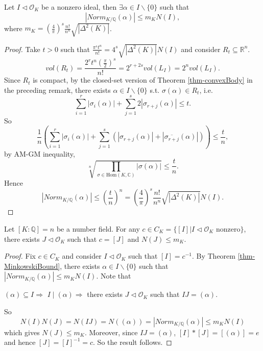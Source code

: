 \begin{theorem}\label{thm-MinkowskiBound}
    Let $I\lhd \mathcal{O}_{K}$ be a nonzero ideal, then $\exists \alpha\in I\backslash \{0\}$ such that 
    \[
    \left| Norm_{K /\mathbb{Q}} (\alpha)\right| \leq m_{K}N(I),
    \]
    where $m_{K}=(\frac{4}{\pi})^{s}\frac{n!}{n^{n}}\sqrt{\left| \Delta^{2}(K) \right| }$. 
\end{theorem}

\begin{proof}
    Take $t>0$ such that $\frac{\pi^{s}t^{n}}{n!}=4^{s}\sqrt{\left| \Delta^{2}(K) \right| }N(I)$ and consider $R_{t}\subseteq \mathbb{R}^{n}$. 
    \[vol(R_{t})=\frac{2^{r}t^{n}(\frac{\pi}{2})^{s}}{n!}=2^{r+2s}vol(L_{I})=2^{n}vol(L_{I}).\]
    Since $R_t$ is compact, by the closed-set version of Theorem \ref{thm-convexBody} in the preceding remark, there exists $\alpha\in I\backslash \{0\}$ s.t. $\sigma(\alpha)\in R_{t}$, i.e. 
    \[
    \sum_{i=1}^{r}\left| \sigma_{i}(\alpha) \right| +\sum_{j=1}^{s}2\left| \sigma_{r+j}(\alpha) \right|\leq t. 
    \]
    So 
    \[
    \frac{1}{n}\left(\sum_{i=1}^{r}\left| \sigma_{i}(\alpha) \right| +\sum_{j=1}^{s}(\left| \sigma_{r+j}(\alpha) \right|+\left| \overline{\sigma_{r+j}}(\alpha)\right|)\right) \leq \frac{t}{n},
    \]
    by AM-GM inequality, 
    \[\sqrt[n]{\prod_{\sigma\in \mathrm{Hom}(K,\mathbb{C})}\left| \sigma(\alpha) \right| }\leq \frac{t}{n}. \]
    Hence 
    \[
    \left| Norm_{K /\mathbb{Q}}(\alpha)\right|\leq (\frac{t}{n})^{n}=(\frac{4}{\pi})^{s}\frac{n!}{n^{n}}\sqrt{\left| \Delta^{2}(K) \right| }N(I). 
    \]
\end{proof}

\begin{corollary}
    Let $[K:\mathbb{Q}]=n$ be a number field. For any $c\in C_{K}=\{[I]|I\lhd\mathcal{O}_{K}\text{ nonzero}\}$, there exists $J\lhd \mathcal{O}_{K}$ such that $c=[J]$ and $N(J)\leq m_{K}$. 
\end{corollary}

\begin{proof}
    Fix $c\in C_{K}$ and consider $I\lhd \mathcal{O}_{K}$ such that $[I]=c^{-1}$. By Theorem \ref{thm-MinkowskiBound}, there exists $\alpha\in I\backslash \{0\}$ such that $\left| Norm_{K /\mathbb{Q}}(\alpha) \right| \leq m_{K}N(I)$. Note that 
    \begin{center}
    $(\alpha)\subseteq I$\quad  $\Rightarrow$ \quad $I\mid (\alpha)$\quad  $\Rightarrow$ \quad  there exists $J\lhd \mathcal{O}_{K}$ such that $IJ=(\alpha)$.    
    \end{center}
    So 
    \[
    N(I)N(J)=N(IJ)=N((\alpha)) = \left|Norm_{K /\mathbb{Q}}(\alpha)\right|\leq m_{K}N(I)
    \] 
    which gives $N(J)\leq m_{K}$. Moreover, since $IJ = (\alpha)$, $[I]*[J] = [(\alpha)] = e$ and hence $[J]=[I]^{-1}=c$. So the result follows.
\end{proof}

